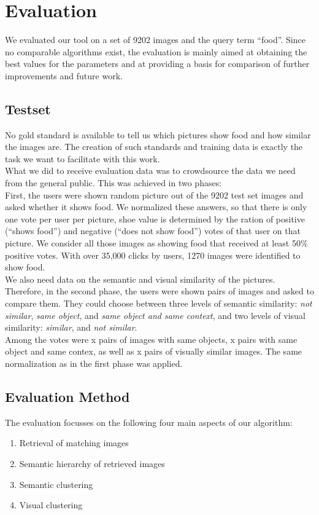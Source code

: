 %
\section{Evaluation}
\label{sec_literatur}

We evaluated our tool on a set of 9202  images and the query term ``food''. Since no comparable algorithms exist, the evaluation is mainly aimed at obtaining the best values for the parameters and at providing a basis for comparison of further improvements and future work.

\subsection{Testset}
No gold standard is available to tell us which pictures show food and how similar the images are. The creation of such standards and training data is exactly the task we want to facilitate with this work.\\ 
What we did to receive evaluation data was to crowdsource the data we need from the general public. This was achieved in two phases:\\

First, the users were shown random picture out of the 9202 test set images and asked whether it shows food. We normalized these answers, so that there is only one vote per user per picture, shoe value is determined by the ration of positive (``shows food'') and negative (``does not show food'') votes of that user on that picture. We consider all those images as showing food that received at least 50\% positive votes. With over 35,000 clicks by  users, 1270 images were identified to show food. \\

We also need data on the semantic and visual similarity of the pictures. Therefore, in the second phase, the users were shown pairs of images and asked to compare them. They could choose between three levels of semantic similarity: \emph{not similar}, \emph{same object}, and \emph{same object and same context}, and two levels of visual similarity: \emph{similar}, and \emph{not similar}.\\
Among the  votes were x pairs of images with same objects, x pairs with same object and same contex, as well as x pairs of visually similar images. The same normalization as in the first phase was applied.

\subsection{Evaluation Method}
The evaluation focusses on the following four main aspects of our algorithm:
\begin{enumerate}
\item Retrieval of matching images
\item Semantic hierarchy of retrieved images
\item Semantic clustering
\item Visual clustering
\end{enumerate}

